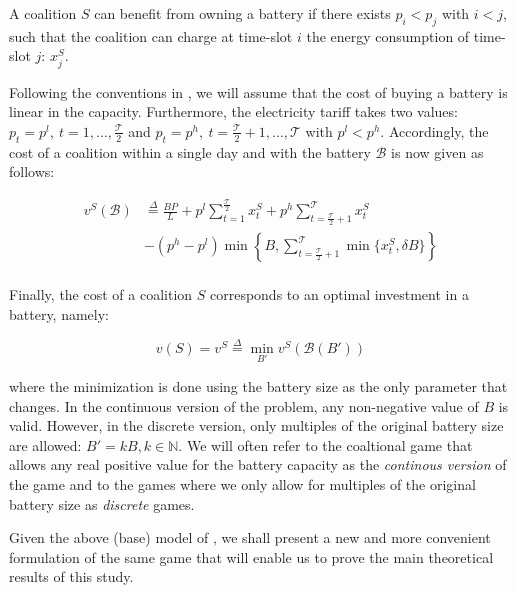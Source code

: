 \documentclass[sigconf, table]{acmart}
\newcommand{\Bat}{\mathcal{B}}
\newcommand{\pricelow}{p^l}
\newcommand{\pricehigh}{p^h}
\begin{document}
A coalition $S$ can benefit from owning a battery if there exists $p_i < p_j$ with $i < j$, such that the coalition can charge at time-slot $i$ the energy consumption of time-slot $j$: $x^S_j$.

Following the conventions in \cite{kiedanskigames}, we will assume that the cost of buying a battery is linear in the capacity. Furthermore, the electricity tariff takes two values: $p_t = \pricelow, \ t=1, \dots, \frac{\mathcal{T}}{2}$ and $p_t = \pricehigh, \ t=\frac{\mathcal{T}}{2} + 1, \dots, \mathcal{T}$ with $\pricelow < \pricehigh$.
Accordingly, the cost of a coalition within a single day and with the battery $\Bat$ is now given as follows:

\begin{equation}
  \begin{aligned}
  \label{eq:cost_coal_bat}
  v^S(\Bat) &\overset{\Delta}{=} \frac{BP}{L} + p^l\sum_{t=1}^{\frac{\mathcal{T}}{2}} x^S_t
  + p^ h\sum_{t=\frac{\mathcal{T}}{2} + 1}^{\mathcal{{T}}} x^S_t \\
  &- (p^h -p^l)\min\left\{ B, \sum_{t=\frac{\mathcal{T}}{2} + 1}^{\mathcal{{T}}} \min\{x^S_t, \delta B\} \right\} \\
  \end{aligned}
\end{equation}


Finally, the cost of a coalition $S$ corresponds to an optimal investment in a battery, namely:

\begin{equation}
  \label{eq:cost_coal}
  v(S) = v^S \overset{\Delta}{=} \min_{B'} v^S(\Bat(B'))
\end{equation}

where the minimization is done using the battery size as the only parameter that changes. In the continuous version of the problem, any non-negative value of $B$ is valid. However, in the discrete version, only multiples of the original battery size are allowed: $B' = kB, k \in \mathbb{N}$. We will often refer to the coaltional game that allows any real positive value for the battery capacity as the \textit{continous version} of the game and to the games where we only allow for multiples of the original battery size as \textit{discrete} games.

Given the above (base) model of \cite{kiedanskigames}, we shall present a new and more convenient formulation of the same game that will enable us to prove the main theoretical results of this study.
\end{document}
